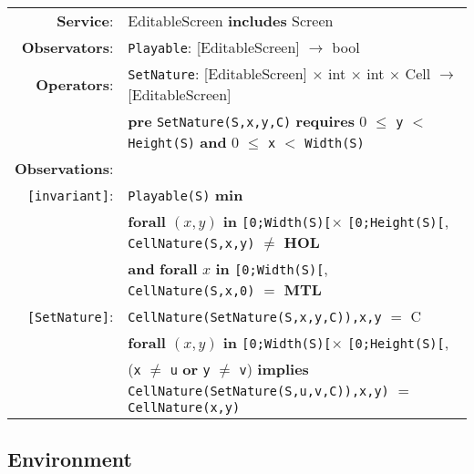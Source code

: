 \documentclass[8pt]{article}
\begin{document}
{\small
\begin{tabular}{rl}
  \textbf{Service}: & \textrm{EditableScreen} {\bf includes} \textrm{Screen}  \\
  \textbf{Observators}: & \texttt{Playable}: \textrm{[EditableScreen]} $\rightarrow$ \textrm{bool} \\
  \textbf{Operators}: & \texttt{SetNature}: \textrm{[EditableScreen]} $\times$ \textrm{int} $\times$ \textrm{int} $\times$ \textrm{Cell}  $\rightarrow$ \textrm{[EditableScreen]} \\
  & \quad \textbf{pre } \texttt{SetNature(S,x,y,C)} \textbf{ requires } 0 $\leq$ \texttt{y} $<$ \texttt{Height(S)} \textbf{ and } 0 $\leq$ \texttt{x} $<$ \texttt{Width(S)}\\
  \textbf{Observations}: \\
  \texttt{[invariant]}: & \texttt{Playable(S)} \textbf{min} \\
  & \quad\quad\quad\quad \textbf{forall} $(x,y)$ \textbf{in} \texttt{[0;Width(S)[}$\times$ \texttt{[0;Height(S)[}, \texttt{CellNature(S,x,y)} $\neq$ \textbf{HOL}  \\
          & \quad\quad\quad\quad \textbf{and} \textbf{forall} $x$ \textbf{in} \texttt{[0;Width(S)[}, \texttt{CellNature(S,x,0)} $=$ \textbf{MTL}  \\
              \texttt{[SetNature]}: & \texttt{CellNature(SetNature(S,x,y,C)),x,y} $=$ C \\
              & \textbf{forall} $(x,y)$ \textbf{in} \texttt{[0;Width(S)[}$\times$ \texttt{[0;Height(S)[}, \\ & \quad\quad\quad\quad (\texttt{x} $\neq$ \texttt{u} \textbf{or} \texttt{y} $\neq$ \texttt{v}) \textbf{implies} \texttt{CellNature(SetNature(S,u,v,C)),x,y)} $=$ \texttt{CellNature(x,y)} \\
\end{tabular}}

\subsection{Environment}
\end{document}
